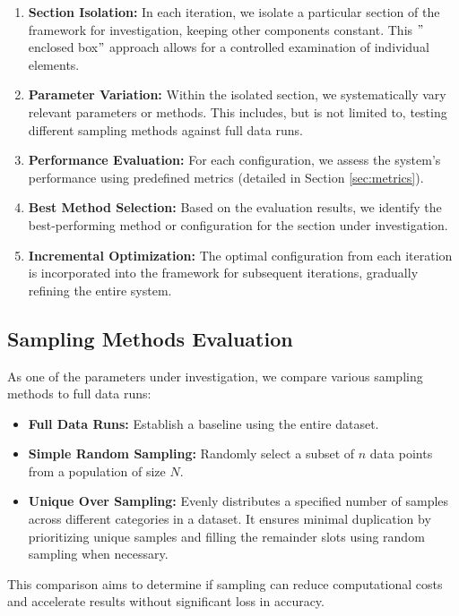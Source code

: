 \begin{enumerate}
    \item \textbf{Section Isolation:} In each iteration, we isolate a particular section of the framework for investigation, keeping other components constant.
    This \("\)enclosed box\("\) approach allows for a controlled examination of individual elements.
    \item \textbf{Parameter Variation:} Within the isolated section, we systematically vary relevant parameters or methods.
    This includes, but is not limited to, testing different sampling methods against full data runs.
    \item \textbf{Performance Evaluation:} For each configuration, we assess the system's performance using predefined metrics (detailed in Section \ref{sec:metrics}).
    \item \textbf{Best Method Selection:} Based on the evaluation results, we identify the best-performing method or configuration for the section under investigation.
    \item \textbf{Incremental Optimization:} The optimal configuration from each iteration is incorporated into the framework for subsequent iterations, gradually refining the entire system.
\end{enumerate}

\subsection{Sampling Methods Evaluation}\label{subsec:sampling-methods-evaluation}

As one of the parameters under investigation, we compare various sampling methods to full data runs:

\begin{itemize}
    \item \textbf{Full Data Runs:} Establish a baseline using the entire dataset.
    \item \textbf{Simple Random Sampling:} Randomly select a subset of $n$ data points from a population of size $N$.
    \item \textbf{Unique Over Sampling:} Evenly distributes a specified number of samples across different categories in a dataset. It ensures minimal duplication by prioritizing unique samples and filling the remainder slots using random sampling when necessary.
\end{itemize}
This comparison aims to determine if sampling can reduce computational costs and accelerate results without significant loss in accuracy.

